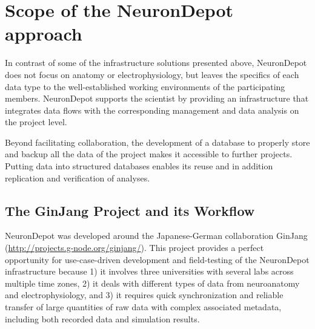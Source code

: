 \documentclass{frontiersSCNS} %
\begin{document}

\section{Scope of the NeuronDepot approach}

In contrast of some of the infrastructure solutions presented above,
NeuronDepot does not focus on anatomy or electrophysiology, but leaves the
specifics of each data type to the well-established working environments of the
participating members. NeuronDepot supports the scientist by providing an
infrastructure that integrates data flows with the corresponding management and
data analysis on the project level.

Beyond facilitating collaboration, the development of a database to properly
store and backup all the data of the project makes it accessible to further
projects. Putting data into structured databases enables its reuse and in
addition replication and verification of analyses.

\subsection{The GinJang Project and its Workflow}

NeuronDepot was developed around the Japanese-German collaboration GinJang
(\url{http://projects.g-node.org/ginjang/}).
This project provides a perfect opportunity for use-case-driven development and
field-testing of the NeuronDepot infrastructure because 1) it involves three
universities with several labs across multiple time zones, 2) it deals with
different types of data from neuroanatomy and electrophysiology, and 3) it
requires quick synchronization and reliable transfer of large quantities of raw
data with complex associated metadata, including both recorded data and
simulation results.
\end{document}
